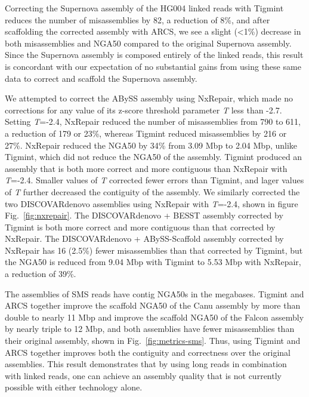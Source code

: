 \documentclass{bmcart}
\begin{document}
Correcting the Supernova assembly of the HG004 linked reads with Tigmint reduces the number of misassemblies by 82, a reduction of 8\%, and after scaffolding the corrected assembly with ARCS, we see a slight (\textless{}1\%) decrease in both misassemblies and NGA50 compared to the original Supernova assembly. Since the Supernova assembly is composed entirely of the linked reads, this result is concordant with our expectation of no substantial gains from using these same data to correct and scaffold the Supernova assembly.

We attempted to correct the ABySS assembly using NxRepair, which made no corrections for any value of its z-score threshold parameter \emph{T} less than -2.7. Setting \emph{T}=-2.4, NxRepair reduced the number of misassemblies from 790 to 611, a reduction of 179 or 23\%, whereas Tigmint reduced misassemblies by 216 or 27\%. NxRepair reduced the NGA50 by 34\% from 3.09 Mbp to 2.04 Mbp, unlike Tigmint, which did not reduce the NGA50 of the assembly. Tigmint produced an assembly that is both more correct and more contiguous than NxRepair with \emph{T}=-2.4. Smaller values of \emph{T} corrected fewer errors than Tigmint, and lager values of \emph{T} further decreased the contiguity of the assembly. We similarly corrected the two DISCOVARdenovo assemblies using NxRepair with \emph{T}=-2.4, shown in figure Fig.~\ref{fig:nxrepair}. The DISCOVARdenovo + BESST assembly corrected by Tigmint is both more correct and more contiguous than that corrected by NxRepair. The DISCOVARdenovo + ABySS-Scaffold assembly corrected by NxRepair has 16 (2.5\%) fewer misassemblies than that corrected by Tigmint, but the NGA50 is reduced from 9.04 Mbp with Tigmint to 5.53 Mbp with NxRepair, a reduction of 39\%.

The assemblies of SMS reads have contig NGA50s in the megabases. Tigmint and ARCS together improve the scaffold NGA50 of the Canu assembly by more than double to nearly 11 Mbp and improve the scaffold NGA50 of the Falcon assembly by nearly triple to 12 Mbp, and both assemblies have fewer misassemblies than their original assembly, shown in Fig.~\ref{fig:metrics-sms}. Thus, using Tigmint and ARCS together improves both the contiguity and correctness over the original assemblies. This result demonstrates that by using long reads in combination with linked reads, one can achieve an assembly quality that is not currently possible with either technology alone.
\end{document}
